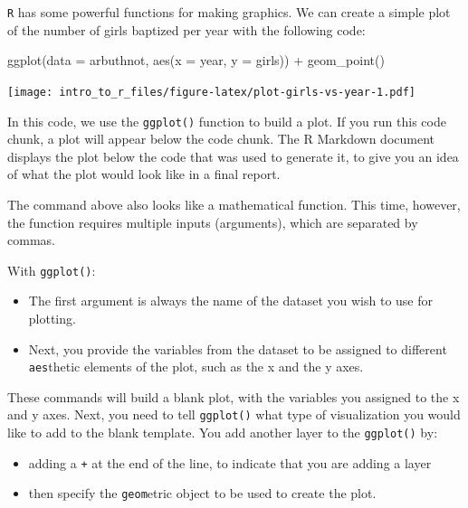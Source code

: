 \documentclass[
]{article}
\newenvironment{Shaded}{\begin{snugshade}}{\end{snugshade}}
\newcommand{\AttributeTok}[1]{\textcolor[rgb]{0.77,0.63,0.00}{#1}}
\newcommand{\FunctionTok}[1]{\textcolor[rgb]{0.00,0.00,0.00}{#1}}
\newcommand{\NormalTok}[1]{#1}
\newcommand{\SpecialCharTok}[1]{\textcolor[rgb]{0.00,0.00,0.00}{#1}}
\providecommand{\tightlist}{%
  \setlength{\itemsep}{0pt}\setlength{\parskip}{0pt}}
\begin{document}
\texttt{R} has some powerful functions for making graphics. We can create a simple plot of the number of girls baptized per year with the following code:

\begin{Shaded}
\begin{Highlighting}[]
\FunctionTok{ggplot}\NormalTok{(}\AttributeTok{data =}\NormalTok{ arbuthnot, }\FunctionTok{aes}\NormalTok{(}\AttributeTok{x =}\NormalTok{ year, }\AttributeTok{y =}\NormalTok{ girls)) }\SpecialCharTok{+} 
  \FunctionTok{geom\_point}\NormalTok{()}
\end{Highlighting}
\end{Shaded}

\texttt{[image: intro\_to\_r\_files/figure-latex/plot-girls-vs-year-1.pdf]}

In this code, we use the \texttt{ggplot()} function to build a plot. If you run this code chunk, a plot will appear below the code chunk. The R Markdown document displays the plot below the code that was used to generate it, to give you an idea of what the plot would look like in a final report.

The command above also looks like a mathematical function. This time, however, the function requires multiple inputs (arguments), which are separated by commas.

With \texttt{ggplot()}:

\begin{itemize}
\tightlist
\item
  The first argument is always the name of the dataset you wish to use for plotting.
\item
  Next, you provide the variables from the dataset to be assigned to different \texttt{aes}thetic elements of the plot, such as the x and the y axes.
\end{itemize}

These commands will build a blank plot, with the variables you assigned to the x and y axes. Next, you need to tell \texttt{ggplot()} what type of visualization you would like to add to the blank template. You add another layer to the \texttt{ggplot()} by:

\begin{itemize}
\tightlist
\item
  adding a \texttt{+} at the end of the line, to indicate that you are adding a layer
\item
  then specify the \texttt{geom}etric object to be used to create the plot.
\end{itemize}
\end{document}
